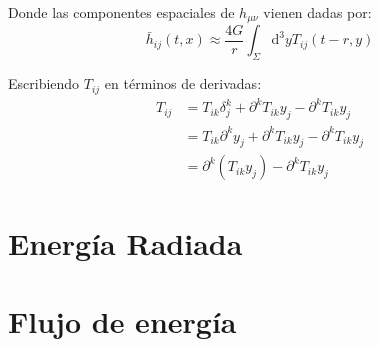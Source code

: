 \documentclass[../main]{subfiles}
\begin{document}
Donde las componentes espaciales de $h_{\mu\nu}$ vienen dadas por:
\begin{equation}
    \bar{h}_{ij}(t, x)\approx \dfrac{4G}{r}\int_{\Sigma}\mathrm{d}^3 y T_{ij}(t-r, y)
\end{equation}

Escribiendo $T_{ij}$ en términos de derivadas:
\begin{equation}
    \begin{split}
        T_{ij}&=T_{ik}\delta^k_j+\partial^k T_{ik}y_j-\partial^k T_{ik}y_j \\
        &=T_{ik}\partial^k y_j+\partial^k T_{ik}y_j-\partial^k T_{ik}y_j \\
        &=\partial^k(T_{ik}y_j)-\partial^k T_{ik} y_j
    \end{split}
\end{equation}


\section{Energía Radiada}

\section{Flujo de energía}
\end{document}
